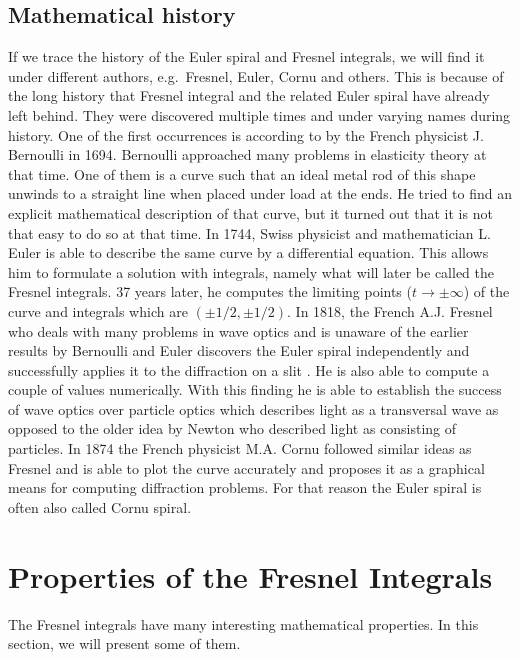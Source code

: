 \documentclass[12pt]{article}
\begin{document}
\subsection{Mathematical history}
If we trace the history of the Euler spiral and Fresnel integrals, we will find it under different authors, e.g.~Fresnel, Euler, Cornu and others.  This is because of the long history that Fresnel integral and the related Euler spiral have already left behind. They were discovered multiple times and under varying names during history.  One of the first occurrences is according to \cite{Lev08} by the French physicist J. Bernoulli in 1694.  Bernoulli approached many problems in elasticity theory at that time. One of them is a curve such that an ideal metal rod of this shape unwinds to a straight line when placed under load at the ends. He tried to find an explicit mathematical description of that curve, but it turned out that it is not that easy to do so at that time. In 1744, Swiss physicist and mathematician L. Euler is able to describe the same curve by a differential equation. This allows him to formulate a solution with integrals, namely what will later be called the Fresnel integrals.  37 years later, he computes the limiting points ($t\to\pm\infty$) of the curve and integrals which are $(\pm1/2,\pm1/2)$. In 1818, the French A.J. Fresnel who deals with many problems in wave optics and is unaware of the earlier results by Bernoulli and Euler discovers the Euler spiral independently and successfully applies it to the diffraction on a slit \cite{Lev08}.  He is also able to compute a couple of values numerically. With this finding he is able to establish the success of wave optics over particle optics which describes light as a transversal wave as opposed to the older idea by Newton who described light as consisting of particles.  In 1874 the French physicist M.A. Cornu followed similar ideas as Fresnel and is able to plot the curve accurately and proposes it as a graphical means for computing diffraction problems.  For that reason the Euler spiral is often also called Cornu spiral.


\section{Properties of the Fresnel Integrals}
The Fresnel integrals have many interesting mathematical properties. In this section, we will present some of them. 
\end{document}
